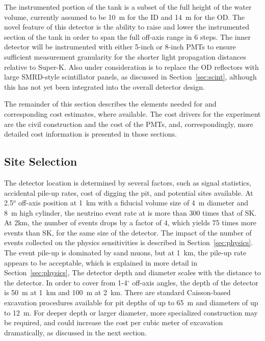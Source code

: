 The instrumented portion of the tank is a subset of the full height of the water volume, currently assumed to be 10~m for the ID and 14~m for the OD. The novel feature of this detector is the ability to raise and lower the instrumented section of the tank in order to span the full off-axis range in 6 steps. The inner detector will be instrumented with either 5-inch or 8-inch PMTs to ensure sufficient measurement granularity for the shorter light propagation distances relative to Super-K. Also under consideration is to replace the OD reflectors with large SMRD-style scintillator panels, as discussed in Section~\ref{sec:scint}, although this has not yet been integrated into the overall detector design.

The remainder of this section describes the elements needed for \nuprism and corresponding cost estimates, where available. The cost drivers for the experiment are the civil construction and the cost of the PMTs, and, correspondingly, more detailed cost information is presented in those sections.



\subsection{Site Selection}

The \nuprism detector location is determined by several factors, such as signal statistics, accidental pile-up rates, cost of digging the pit, and potential sites available.
At 2.5$^o$ off-axis position at 1~km with a fiducial volume size of 4~m diameter and 8~m high cylinder, the neutrino event rate at \nuprism is more than 300 times that of SK. At 2km, the number of events drops by a factor of 4, which yields 75 times more events than SK, for the same size of the detector. The impact of the number of events collected on the physics sensitivities is described in Section~\ref{sec:physics}. The event pile-up is dominated by sand muons, but at 1~km, the pile-up rate appears to be acceptable, which is explained in more detail in Section~\ref{sec:physics},  The detector depth and diameter scales with the distance to the \nuprism detector. In order to cover from 1-4$^\circ$ off-axis angles, the depth of the detector is 50~m at 1~km and 100~m at 2~km. There are standard Caisson-based excavation procedures available for pit depths of up to 65~m and diameters of up to 12~m. For deeper depth or larger diameter, more specialized construction may be required, and could increase the cost per cubic meter of excavation dramatically, as discussed in the next section.

